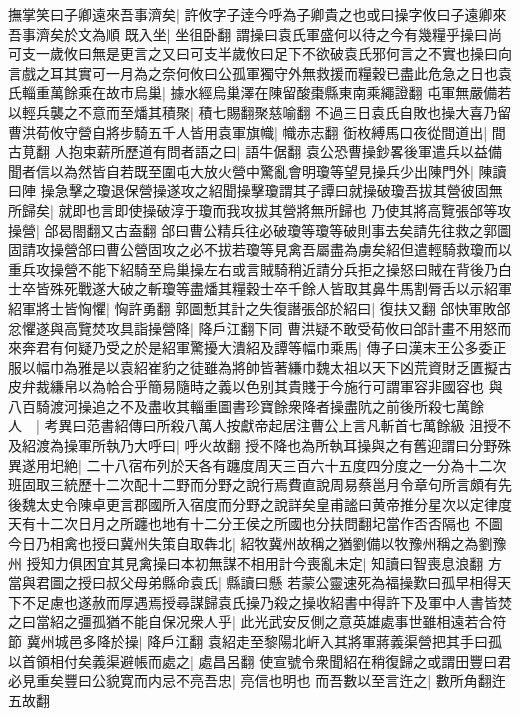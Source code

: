 撫掌笑曰子卿遠來吾事濟矣|{
	許攸字子逹今呼為子卿貴之也或曰操字攸曰子遠卿來吾事濟矣於文為順}
既入坐|{
	坐徂卧翻}
謂操曰袁氏軍盛何以待之今有幾糧乎操曰尚可支一歲攸曰無是更言之又曰可支半歲攸曰足下不欲破袁氏邪何言之不實也操曰向言戲之耳其實可一月為之奈何攸曰公孤軍獨守外無救援而糧穀已盡此危急之日也袁氏輜重萬餘乘在故市烏巢|{
	據水經烏巢澤在陳留酸棗縣東南乘繩證翻}
屯軍無嚴備若以輕兵襲之不意而至燔其積聚|{
	積七賜翻聚慈喻翻}
不過三日袁氏自敗也操大喜乃留曹洪荀攸守營自將步騎五千人皆用袁軍旗幟|{
	幟赤志翻}
衘枚縛馬口夜從間道出|{
	間古莧翻}
人抱束薪所歷道有問者語之曰|{
	語牛倨翻}
袁公恐曹操鈔畧後軍遣兵以益備聞者信以為然皆自若既至圍屯大放火營中驚亂會明瓊等望見操兵少出陳門外|{
	陳讀曰陣}
操急擊之瓊退保營操遂攻之紹聞操擊瓊謂其子譚曰就操破瓊吾拔其營彼固無所歸矣|{
	就即也言即使操破淳于瓊而我攻拔其營將無所歸也}
乃使其將高覽張郃等攻操營|{
	郃曷閤翻又古盍翻}
郃曰曹公精兵往必破瓊等瓊等破則事去矣請先往救之郭圖固請攻操營郃曰曹公營固攻之必不拔若瓊等見禽吾屬盡為虜矣紹但遣輕騎救瓊而以重兵攻操營不能下紹騎至烏巢操左右或言賊騎稍近請分兵拒之操怒曰賊在背後乃白士卒皆殊死戰遂大破之斬瓊等盡燔其糧穀士卒千餘人皆取其鼻牛馬割脣舌以示紹軍紹軍將士皆恟懼|{
	恟許勇翻}
郭圖慙其計之失復譖張郃於紹曰|{
	復扶又翻}
郃快軍敗郃忿懼遂與高覽焚攻具詣操營降|{
	降戶江翻下同}
曹洪疑不敢受荀攸曰郃計畫不用怒而來奔君有何疑乃受之於是紹軍驚擾大潰紹及譚等幅巾乘馬|{
	傳子曰漢末王公多委正服以幅巾為雅是以袁紹崔豹之徒雖為將帥皆著縑巾魏太祖以天下凶荒資財乏匱擬古皮弁裁縑帛以為帢合乎簡易隨時之義以色别其貴賤于今施行可謂軍容非國容也}
與八百騎渡河操追之不及盡收其輜重圖書珍寶餘衆降者操盡阬之前後所殺七萬餘人　|{
	考異曰范書紹傳曰所殺八萬人按獻帝起居注曹公上言凡斬首七萬餘級}
沮授不及紹渡為操軍所執乃大呼曰|{
	呼火故翻}
授不降也為所執耳操與之有舊迎謂曰分野殊異遂用圯絶|{
	二十八宿布列於天各有躔度周天三百六十五度四分度之一分為十二次班固取三統歷十二次配十二野而分野之說行焉費直說周易蔡邕月令章句所言頗有先後魏太史令陳卓更言郡國所入宿度而分野之說詳矣皇甫謐曰黄帝推分星次以定律度天有十二次日月之所躔也地有十二分王侯之所國也分扶問翻圮當作否否隔也}
不圖今日乃相禽也授曰冀州失策自取犇北|{
	紹牧冀州故稱之猶劉備以牧豫州稱之為劉豫州}
授知力俱困宜其見禽操曰本初無謀不相用計今喪亂未定|{
	知讀曰智喪息浪翻}
方當與君圖之授曰叔父母弟縣命袁氏|{
	縣讀曰懸}
若蒙公靈速死為福操歎曰孤早相得天下不足慮也遂赦而厚遇焉授尋謀歸袁氏操乃殺之操收紹書中得許下及軍中人書皆焚之曰當紹之彊孤猶不能自保况衆人乎|{
	此光武安反側之意英雄處事世雖相遠若合符節}
冀州城邑多降於操|{
	降戶江翻}
袁紹走至黎陽北㟁入其將軍蔣義渠營把其手曰孤以首領相付矣義渠避帳而處之|{
	處昌呂翻}
使宣號令衆聞紹在稍復歸之或謂田豐曰君必見重矣豐曰公貌寛而内忌不亮吾忠|{
	亮信也明也}
而吾數以至言迕之|{
	數所角翻迕五故翻}

